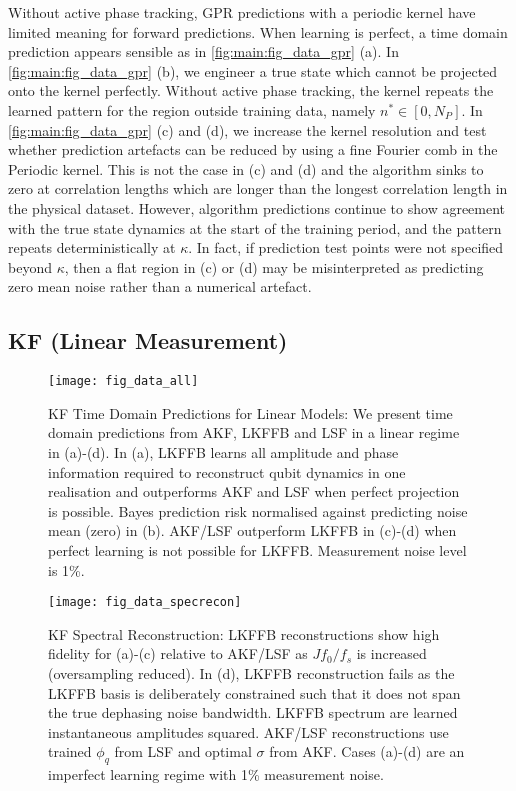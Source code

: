Without active phase tracking, GPR predictions with a periodic kernel have limited meaning for forward predictions. When learning is perfect, a time domain prediction appears sensible as in \cref{fig:main:fig_data_gpr} (a). In \cref{fig:main:fig_data_gpr} (b), we engineer a true state which cannot be projected onto the kernel perfectly. Without active phase tracking, the kernel repeats the learned pattern for the region outside training data, namely $n^* \in [0, N_P]$.  In \cref{fig:main:fig_data_gpr} (c) and (d), we increase the kernel resolution and test whether prediction artefacts can be reduced by using a fine Fourier comb in the Periodic kernel. This is not the case in (c) and (d) and the algorithm sinks to zero at correlation lengths which are longer than the longest correlation length in the physical dataset. However, algorithm predictions continue to show agreement with the true state dynamics at the start of the training period, and the pattern repeats deterministically at $\kappa$. In fact, if prediction test points were not specified beyond $\kappa$, then a flat region in (c) or (d) may be misinterpreted as predicting zero mean noise rather than a numerical artefact. 

\subsection{KF (Linear Measurement)}

\begin{figure}
\caption{\label{fig:main:fig_data_all} KF Time Domain Predictions for Linear Models: We present time domain predictions from AKF, LKFFB and LSF in a linear regime in (a)-(d). In (a), LKFFB learns all amplitude and phase information required to reconstruct qubit dynamics in one realisation and outperforms AKF and LSF when perfect projection is possible. Bayes prediction risk normalised against predicting noise mean (zero) in (b). AKF/LSF outperform LKFFB in (c)-(d) when perfect learning is not possible for LKFFB. Measurement noise level is 1\%.}
\texttt{[image: fig\_data\_all]}
\end{figure} 

\begin{figure}
    \caption{\label{fig:main:fig_data_specrecon} KF Spectral Reconstruction: LKFFB reconstructions show high fidelity for (a)-(c) relative to AKF/LSF as $Jf_0/f_s$ is increased (oversampling reduced). In (d), LKFFB reconstruction fails as the LKFFB basis is deliberately constrained such that it does not span the true dephasing noise bandwidth. LKFFB spectrum are learned instantaneous amplitudes squared. AKF/LSF reconstructions use trained $\phi_q$ from LSF and optimal $\sigma$ from AKF. Cases (a)-(d) are an imperfect learning regime with 1\% measurement noise.}
    \texttt{[image: fig\_data\_specrecon]}
\end{figure} 

